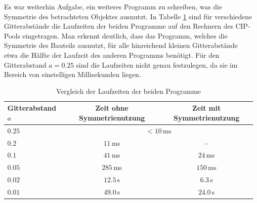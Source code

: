 \documentclass[10pt,a4paper]{article}
\begin{document}
\par
Es war weiterhin Aufgabe, ein weiteres Programm zu schreiben, was die Symmetrie des betrachteten Objektes ausnutzt. In Tabelle \ref{tab:zeiten} sind für verschiedene Gitterabstände die Laufzeiten der beiden Programme auf den Rechnern des CIP-Pools eingetragen. Man erkennt deutlich, dass das Programm, welches die Symmetrie des Bauteils ausnutzt, für alle hinreichend kleinen Gitterabstände etwa die Hälfte der Laufzeit des anderen Programms benötigt. Für den Gitterabstand $a=\num{0,25}$ sind die Laufzeiten nicht genau festzulegen, da sie im Bereich von einstelligen Millisekunden liegen.
\begin{table}
\centering
\begin{tabular}{l c c}
\toprule
Gitterabstand $a$ & Zeit ohne Symmetrienutzung & Zeit mit Symmetrienutzung \\\midrule
$\num{0,25}$ & \multicolumn{2}{c}{$<\num{10}$\,\si{\milli\second}}\\
$\num{0,2}$  & $\num{11}$\,\si{\milli\second}    & -\footnotemark \\
$\num{0,1}$  & $\num{41}$\,\si{\milli\second}    & $\num{24}$\,\si{\milli\second} \\
$\num{0,05}$ & $\num{285}$\,\si{\milli\second}   & $\num{150}$\,\si{\milli\second} \\
$\num{0,02}$ & $\num{12,5}$\,\si{\second}        & $\num{6,3}$\,\si{\second} \\
$\num{0,01}$ & $\num{49,0}$\,\si{\second}        & $\num{24,0}$\,\si{\second} \\
\bottomrule
\end{tabular}
\caption{Vergleich der Laufzeiten der beiden Programme}
\label{tab:zeiten}
\end{table}
\end{document}
